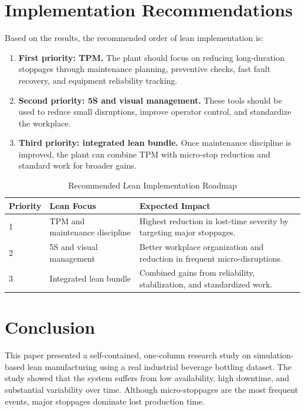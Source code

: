 \documentclass[12pt,a4paper]{article}
\begin{document}
\section{Implementation Recommendations}
Based on the results, the recommended order of lean implementation is:
\begin{enumerate}
    \item \textbf{First priority: TPM.} The plant should focus on reducing long-duration stoppages through maintenance planning, preventive checks, fast fault recovery, and equipment reliability tracking.
    \item \textbf{Second priority: 5S and visual management.} These tools should be used to reduce small disruptions, improve operator control, and standardize the workplace.
    \item \textbf{Third priority: integrated lean bundle.} Once maintenance discipline is improved, the plant can combine TPM with micro-stop reduction and standard work for broader gains.
\end{enumerate}

\begin{table}[H]
\centering
\caption{Recommended Lean Implementation Roadmap}
\begin{tabular}{p{3cm}p{4.2cm}p{7cm}}
\toprule
\textbf{Priority} & \textbf{Lean Focus} & \textbf{Expected Impact} \\
\midrule
1 & TPM and maintenance discipline & Highest reduction in lost-time severity by targeting major stoppages. \\
2 & 5S and visual management & Better workplace organization and reduction in frequent micro-disruptions. \\
3 & Integrated lean bundle & Combined gains from reliability, stabilization, and standardized work. \\
\bottomrule
\end{tabular}
\end{table}

\section{Conclusion}
This paper presented a self-contained, one-column research study on simulation-based lean manufacturing using a real industrial beverage bottling dataset. The study showed that the system suffers from low availability, high downtime, and substantial variability over time. Although micro-stoppages are the most frequent events, major stoppages dominate lost production time.
\end{document}
